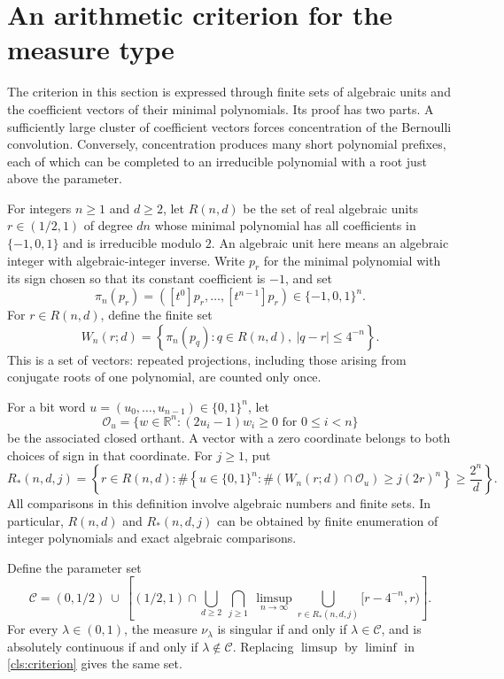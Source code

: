 \section{An arithmetic criterion for the measure type}
\label{cls:section-criterion}

The criterion in this section is expressed through finite sets of algebraic
units and the coefficient vectors of their minimal polynomials.  Its proof
has two parts.  A sufficiently large cluster of coefficient vectors forces
concentration of the Bernoulli convolution.  Conversely, concentration
produces many short polynomial prefixes, each of which can be completed to
an irreducible polynomial with a root just above the parameter.

For integers $n\geq 1$ and $d\geq 2$, let $R(n,d)$ be the set of real
algebraic units $r\in(1/2,1)$ of degree $dn$ whose minimal polynomial has
all coefficients in $\{-1,0,1\}$ and is irreducible modulo $2$.  An
algebraic unit here means an algebraic integer with algebraic-integer
inverse.  Write $p_r$ for the minimal polynomial with its sign chosen so
that its constant coefficient is $-1$, and set
\[
  \pi_n(p_r)=([t^0]p_r,\ldots,[t^{n-1}]p_r)\in\{-1,0,1\}^n.
\]
For $r\in R(n,d)$, define the finite set
\begin{equation}
  W_n(r;d)=
  \left\{\pi_n(p_q):q\in R(n,d),\ |q-r|\leq 4^{-n}\right\}.
  \label{cls:projection-set}
\end{equation}
This is a set of vectors: repeated projections, including those arising
from conjugate roots of one polynomial, are counted only once.

For a bit word $u=(u_0,\ldots,u_{n-1})\in\{0,1\}^n$, let
\[
  \mathcal O_u=
  \{w\in\mathbb R^n:(2u_i-1)w_i\geq0\text{ for }0\leq i<n\}
\]
be the associated closed orthant.  A vector with a zero coordinate belongs
to both choices of sign in that coordinate.  For $j\geq1$, put
\begin{equation}
  R_*(n,d,j)=
  \left\{r\in R(n,d):
    \#\left\{u\in\{0,1\}^n:
       \#(W_n(r;d)\cap\mathcal O_u)\geq j(2r)^n
    \right\}\geq\frac{2^n}{d}\right\}.
  \label{cls:retained-roots}
\end{equation}
All comparisons in this definition involve algebraic numbers and finite
sets.  In particular, $R(n,d)$ and $R_*(n,d,j)$ can be obtained by finite
enumeration of integer polynomials and exact algebraic comparisons.

\begin{theorem}\label{cls:classification}
Define the parameter set
\begin{equation}
  \mathcal C=(0,1/2)\ \cup\
  \left[(1/2,1)\cap
  \bigcup_{d\geq2}\ \bigcap_{j\geq1}\
  \limsup_{n\to\infty}
  \bigcup_{r\in R_*(n,d,j)}[r-4^{-n},r)\right].
  \label{cls:criterion}
\end{equation}
For every $\lambda\in(0,1)$, the measure $\nu_\lambda$ is singular if and
only if $\lambda\in\mathcal C$, and is absolutely continuous if and only
if $\lambda\notin\mathcal C$.  Replacing $\limsup$ by $\liminf$ in
\eqref{cls:criterion} gives the same set.
\end{theorem}

